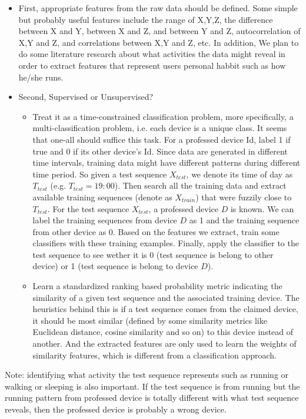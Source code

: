 \documentclass{article}
\begin{document}
	\begin{itemize}
		\item First, appropriate features from the raw data should be defined. Some simple but probably useful features include the range of X,Y,Z, the difference between X and Y, between X and Z, and between Y and Z, autocorrelation of X,Y and Z, and correlations between X,Y and Z, etc. In addition, We plan to do some literature research about what activities the data might reveal in order to extract features that represent users personal habbit such as how he/she runs. 
		\item Second, Supervised or Unsupervised?
			\begin{itemize}
			\item Treat it as a time-constrained classification problem, more specifically, a multi-classification problem, i.e. each device is a unique class. It seems that one-all should suffice this task. For a professed device Id, label 1 if true and 0 if its other device's Id. Since data are generated in different time intervals, training data might have different patterns during different time period. So given a test sequence $X_{test}$, we denote its time of day as $T_{test}$ (e.g. $T_{test}=19:00$). Then search all the training data and extract available training sequences (denote as $X_{train}$) that were fuzzily close to $T_{test}$. For the test sequence $X_{test}$, a professed device $D$ is known. We can label the training sequences from device $D$ as 1 and the training sequence from other device as 0. Based on the features we extract, train some classifiers with these training examples. Finally, apply the classifier to the test sequence to see wether it is 0 (test sequence is belong to other device) or 1 (test sequence is belong to device $D$).\\
			\item Learn a standardized ranking based probability metric indicating the similarity of a given test sequence and the associated training device. The heuristics behind this is if a test sequence comes from the claimed device, it should be most similar (defined by some similarity metrics like Euclidean distance, cosine similarity and so on) to this device instead of another. And the extracted features are only used to learn the weights of similarity features, which is different from a classification approach.
			\end{itemize}
	\end{itemize}
	Note: identifying what activity the test sequence represents such as running or walking or sleeping is also important. If the test sequence is from running but the running pattern from professed device is totally different with what test sequence reveals, then the professed device is probably a wrong device. 
\end{document}
